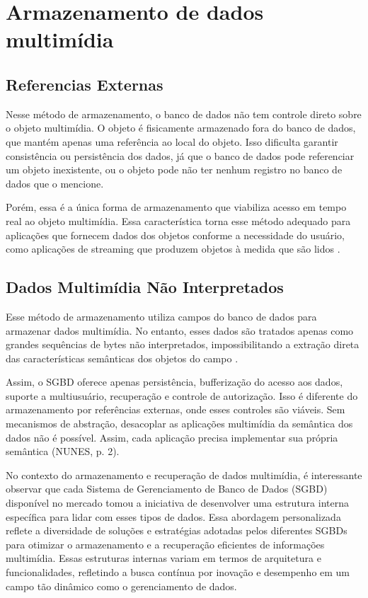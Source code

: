 \documentclass[12pt]{article}
\begin{document}
	\section{Armazenamento de dados multimídia}
	\vspace{0.5 cm} \subsection{Referencias Externas}
	
	Nesse método de armazenamento, o banco de dados não tem controle direto sobre o objeto multimídia. O objeto é fisicamente armazenado fora do banco de dados, que mantém apenas uma referência ao local do objeto. Isso dificulta garantir consistência ou persistência dos dados, já que o banco de dados pode referenciar um objeto inexistente, ou o objeto pode não ter nenhum registro no banco de dados que o mencione.
	
	Porém, essa é a única forma de armazenamento que viabiliza acesso em tempo real ao objeto multimídia. Essa característica torna esse método adequado para aplicações que fornecem dados dos objetos conforme a necessidade do usuário, como aplicações de streaming que produzem objetos à medida que são lidos \cite{silva2006benchmark}.
	
	\subsection{Dados Multimídia Não Interpretados}
	
	Esse método de armazenamento utiliza campos do banco de dados para armazenar dados multimídia. No entanto, esses dados são tratados apenas como grandes sequências de bytes não interpretados, impossibilitando a extração direta das características semânticas dos objetos do campo \cite{silva2006benchmark}.
	
	Assim, o SGBD oferece apenas persistência, bufferização do acesso aos dados, suporte a multiusuário, recuperação e controle de autorização. Isso é diferente do armazenamento por referências externas, onde esses controles são viáveis. Sem mecanismos de abstração, desacoplar as aplicações multimídia da semântica dos dados não é possível. Assim, cada aplicação precisa implementar sua própria semântica (NUNES, p. 2).
	
	No contexto do armazenamento e recuperação de dados multimídia, é interessante observar que cada Sistema de Gerenciamento de Banco de Dados (SGBD) disponível no mercado tomou a iniciativa de desenvolver uma estrutura interna específica para lidar com esses tipos de dados. Essa abordagem personalizada reflete a diversidade de soluções e estratégias adotadas pelos diferentes SGBDs para otimizar o armazenamento e a recuperação eficientes de informações multimídia. Essas estruturas internas variam em termos de arquitetura e funcionalidades, refletindo a busca contínua por inovação e desempenho em um campo tão dinâmico como o gerenciamento de dados.
	
\end{document}
